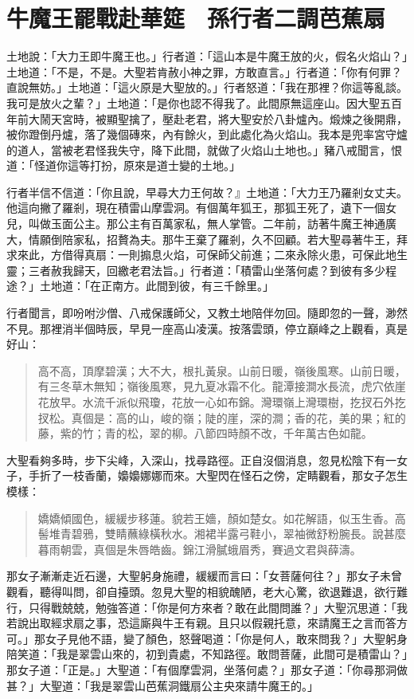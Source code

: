 
\chapter{牛魔王罷戰赴華筵　孫行者二調芭蕉扇}

土地說：「大力王即牛魔王也。」行者道：「這山本是牛魔王放的火，假名火焰山？」土地道：「不是，不是。大聖若肯赦小神之罪，方敢直言。」行者道：「你有何罪？直說無妨。」土地道：「這火原是大聖放的。」行者怒道：「我在那裡？你這等亂談。我可是放火之輩？」土地道：「是你也認不得我了。此間原無這座山。因大聖五百年前大鬧天宮時，被顯聖擒了，壓赴老君，將大聖安於八卦爐內。煅煉之後開鼎，被你蹬倒丹爐，落了幾個磚來，內有餘火，到此處化為火焰山。我本是兜率宮守爐的道人，當被老君怪我失守，降下此間，就做了火焰山土地也。」豬八戒聞言，恨道：「怪道你這等打扮，原來是道士變的土地。」

行者半信不信道：「你且說，早尋大力王何故？』土地道：「大力王乃羅剎女丈夫。他這向撇了羅剎，現在積雷山摩雲洞。有個萬年狐王，那狐王死了，遺下一個女兒，叫做玉面公主。那公主有百萬家私，無人掌管。二年前，訪著牛魔王神通廣大，情願倒陪家私，招贅為夫。那牛王棄了羅剎，久不回顧。若大聖尋著牛王，拜求來此，方借得真扇：一則搧息火焰，可保師父前進；二來永除火患，可保此地生靈；三者赦我歸天，回繳老君法旨。」行者道：「積雷山坐落何處？到彼有多少程途？」土地道：「在正南方。此間到彼，有三千餘里。」

行者聞言，即吩咐沙僧、八戒保護師父，又教土地陪伴勿回。隨即忽的一聲，渺然不見。那裡消半個時辰，早見一座高山凌漢。按落雲頭，停立巔峰之上觀看，真是好山：
\begin{quote}
高不高，頂摩碧漢；大不大，根扎黃泉。山前日暖，嶺後風寒。山前日暖，有三冬草木無知；嶺後風寒，見九夏冰霜不化。龍潭接澗水長流，虎穴依崖花放早。水流千派似飛瓊，花放一心如布錦。灣環嶺上灣環樹，扢扠石外扢扠松。真個是：高的山，峻的嶺；陡的崖，深的澗；香的花，美的果；紅的藤，紫的竹；青的松，翠的柳。八節四時顏不改，千年萬古色如龍。
\end{quote}

大聖看夠多時，步下尖峰，入深山，找尋路徑。正自沒個消息，忽見松陰下有一女子，手折了一枝香蘭，嬝嬝娜娜而來。大聖閃在怪石之傍，定睛觀看，那女子怎生模樣：
\begin{quote}
嬌嬌傾國色，緩緩步移蓮。貌若王嬙，顏如楚女。如花解語，似玉生香。高髻堆青碧鴉，雙睛蘸綠橫秋水。湘裙半露弓鞋小，翠袖微舒粉腕長。說甚麼暮雨朝雲，真個是朱唇皓齒。錦江滑膩蛾眉秀，賽過文君與薛濤。
\end{quote}

那女子漸漸走近石邊，大聖躬身施禮，緩緩而言曰：「女菩薩何往？」那女子未曾觀看，聽得叫問，卻自擡頭。忽見大聖的相貌醜陋，老大心驚，欲退難退，欲行難行，只得戰兢兢，勉強答道：「你是何方來者？敢在此間問誰？」大聖沉思道：「我若說出取經求扇之事，恐這廝與牛王有親。且只以假親托意，來請魔王之言而答方可。」那女子見他不語，變了顏色，怒聲喝道：「你是何人，敢來問我？」大聖躬身陪笑道：「我是翠雲山來的，初到貴處，不知路徑。敢問菩薩，此間可是積雷山？」那女子道：「正是。」大聖道：「有個摩雲洞，坐落何處？」那女子道：「你尋那洞做甚？」大聖道：「我是翠雲山芭蕉洞鐵扇公主央來請牛魔王的。」

